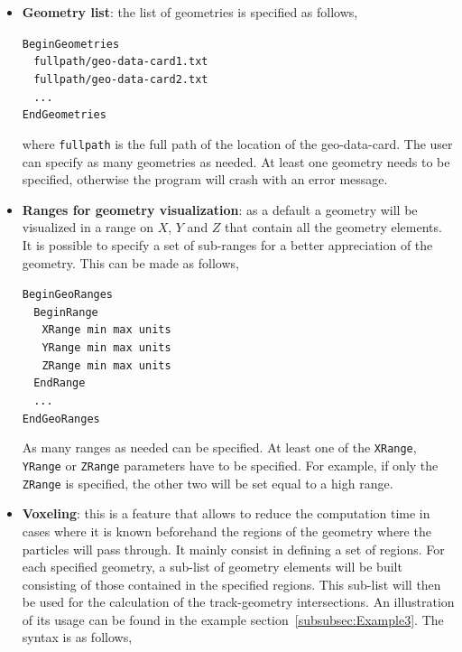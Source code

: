 \begin{itemize}
 \item {\bf Geometry list}: the list of geometries is specified as follows,
 
 \noindent
 {\tt BeginGeometries} \\
 $~~~~${\tt fullpath/geo-data-card1.txt} \\
 $~~~~${\tt fullpath/geo-data-card2.txt} \\
 $~~~~${\tt ...} \\
 {\tt EndGeometries}
 
 \noindent
 where {\tt fullpath} is the full path of the location of the geo-data-card. The user can specify as many geometries as needed. At least one 
 geometry needs to be specified, otherwise the program will crash with an error message.
 
 \item {\bf Ranges for geometry visualization}: as a default a geometry will be visualized in a range on $X$, $Y$ and $Z$ that contain all the geometry elements. It is possible to 
 specify a set of sub-ranges for a better appreciation of the geometry. This can be made as follows,
 
 \noindent
 {\tt BeginGeoRanges} \\
 $~~~~${\tt BeginRange} \\
 $~~~~~~~${\tt XRange   min  max units} \\
 $~~~~~~~${\tt YRange   min  max units} \\
 $~~~~~~~${\tt ZRange   min  max units} \\
 $~~~~${\tt EndRange} \\
 $~~~~${\tt ...} \\
 {\tt EndGeoRanges}
 
 \noindent
 As many ranges as needed can be specified. At least one of the {\tt XRange}, {\tt YRange} or {\tt ZRange} parameters have to be specified. For example, if only the 
 {\tt ZRange} is specified, the other two will be set equal to a high range.

 \item {\bf Voxeling}: this is a feature that allows to reduce the computation time in cases where it is known beforehand the regions of the geometry where the particles 
 will pass through. It mainly consist in defining a set of regions. For each specified geometry, a sub-list of geometry elements will be built consisting of those contained 
 in the specified regions. This sub-list will then be used for the calculation of the track-geometry intersections. An illustration of its usage can be found in the example 
 section~\ref{subsubsec:Example3}. The syntax is as follows,
 

\end{itemize}
